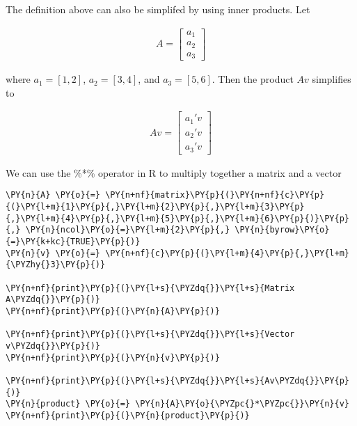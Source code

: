 The definition above can also be simplifed by using inner products. Let

\begin{align}
    A = \begin{bmatrix}
          a_{1} \\ 
          a_{2} \\ 
          a_{3} 
        \end{bmatrix}
\end{align}

where \(a_{1} = [1,2]\), \(a_{2} = [3,4]\), and \(a_{3} = [5,6]\). Then
the product \(Av\) simplifies to

\begin{align}
    Av = \begin{bmatrix}
            a_{1}'v\\
            a_{2}'v\\
            a_{3}'v
         \end{bmatrix}
\end{align}

We can use the \%*\% operator in R to multiply together a matrix and a
vector

    \begin{tcolorbox}[breakable, size=fbox, boxrule=1pt, pad at break*=1mm,colback=cellbackground, colframe=cellborder]
\begin{Verbatim}[commandchars=\\\{\}]
\PY{n}{A} \PY{o}{=} \PY{n+nf}{matrix}\PY{p}{(}\PY{n+nf}{c}\PY{p}{(}\PY{l+m}{1}\PY{p}{,}\PY{l+m}{2}\PY{p}{,}\PY{l+m}{3}\PY{p}{,}\PY{l+m}{4}\PY{p}{,}\PY{l+m}{5}\PY{p}{,}\PY{l+m}{6}\PY{p}{)}\PY{p}{,} \PY{n}{ncol}\PY{o}{=}\PY{l+m}{2}\PY{p}{,} \PY{n}{byrow}\PY{o}{=}\PY{k+kc}{TRUE}\PY{p}{)}
\PY{n}{v} \PY{o}{=} \PY{n+nf}{c}\PY{p}{(}\PY{l+m}{4}\PY{p}{,}\PY{l+m}{\PYZhy{}3}\PY{p}{)}

\PY{n+nf}{print}\PY{p}{(}\PY{l+s}{\PYZdq{}}\PY{l+s}{Matrix A\PYZdq{}}\PY{p}{)}
\PY{n+nf}{print}\PY{p}{(}\PY{n}{A}\PY{p}{)}

\PY{n+nf}{print}\PY{p}{(}\PY{l+s}{\PYZdq{}}\PY{l+s}{Vector v\PYZdq{}}\PY{p}{)}
\PY{n+nf}{print}\PY{p}{(}\PY{n}{v}\PY{p}{)}

\PY{n+nf}{print}\PY{p}{(}\PY{l+s}{\PYZdq{}}\PY{l+s}{Av\PYZdq{}}\PY{p}{)}
\PY{n}{product} \PY{o}{=} \PY{n}{A}\PY{o}{\PYZpc{}*\PYZpc{}}\PY{n}{v}
\PY{n+nf}{print}\PY{p}{(}\PY{n}{product}\PY{p}{)}
\end{Verbatim}
\end{tcolorbox}

